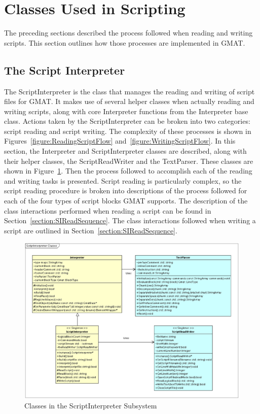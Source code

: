 \section{\label{section:ScriptClasses}Classes Used in Scripting}

The preceding sections described the process followed when reading and writing scripts.  This
section outlines how those processes are implemented in GMAT.

\subsection{\label{section:ScriptInterpreter}The Script Interpreter}

The ScriptInterpreter is the class that manages the reading and writing of script files for GMAT.
It makes use of several helper classes when actually reading and writing scripts, along with core
Interpreter functions from the Interpreter base class.  Actions taken by the ScriptInterpreter can
be broken into two categories: script reading and script writing.  The complexity of these processes
is shown in Figures~\ref{figure:ReadingScriptFlow} and~\ref{figure:WritingScriptFlow}.  In this
section, the Interpreter and ScriptInterpreter classes are described, along with their helper
classes, the ScriptReadWriter and the TextParser.  These classes are shown in
Figure~\ref{figure:ScriptInterpreterClasses}.  Then the process followed to accomplish each of the
reading and writing tasks is presented. Script reading is particularly complex, so the script
reading procedure is broken into descriptions of the process followed for each of the four types of
script blocks GMAT supports.  The description of the class interactions performed when reading a
script can be found in Section~\ref{section:SIReadSequence}. The class interactions followed when
writing a script are outlined in Section~\ref{section:SIReadSequence}.

\begin{figure}[htb]
\begin{center}
\includegraphics[scale=0.5]{Images/ScriptInterpreterClasses.eps}
\caption{\label{figure:ScriptInterpreterClasses}Classes in the ScriptInterpreter Subsystem}
\end{center}
\end{figure}

